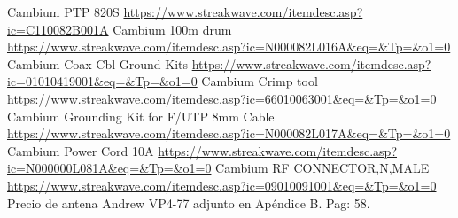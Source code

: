 \begin{thebibliography}{99}
Cambium PTP 820S \url{https://www.streakwave.com/itemdesc.asp?ic=C110082B001A}
Cambium 100m drum \url{https://www.streakwave.com/itemdesc.asp?ic=N000082L016A&eq=&Tp=&o1=0}
Cambium Coax Cbl Ground Kits \url{https://www.streakwave.com/itemdesc.asp?ic=01010419001&eq=&Tp=&o1=0}
Cambium Crimp tool \url{https://www.streakwave.com/itemdesc.asp?ic=66010063001&eq=&Tp=&o1=0}
Cambium Grounding Kit for F/UTP 8mm Cable \url{https://www.streakwave.com/itemdesc.asp?ic=N000082L017A&eq=&Tp=&o1=0}
Cambium Power Cord 10A \url{https://www.streakwave.com/itemdesc.asp?ic=N000000L081A&eq=&Tp=&o1=0}
Cambium RF CONNECTOR,N,MALE \url{https://www.streakwave.com/itemdesc.asp?ic=09010091001&eq=&Tp=&o1=0}
Precio de antena Andrew VP4-77 adjunto en Apéndice B. Pag: 58. 
\end{thebibliography}

\newpage